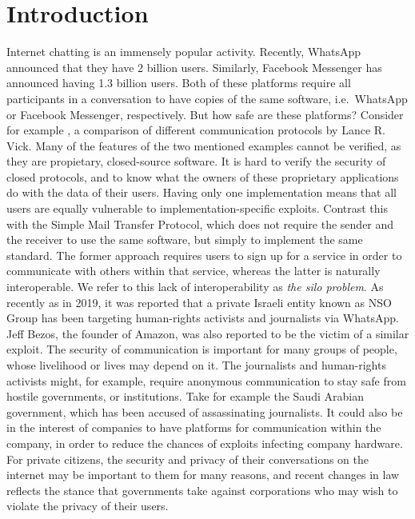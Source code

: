 \section{Introduction}
Internet chatting is an immensely popular activity.
Recently, WhatsApp announced that they have 2 billion users\cite{whatsapp_2b_users_archive_org}.
Similarly, Facebook Messenger has announced having 1.3 billion users\cite{messenger_1pt3b_users}.
Both of these platforms require all participants in a conversation to have copies of the same software, i.e.~WhatsApp or Facebook Messenger, respectively.
But how safe are these platforms?
Consider for example \cite{twitter_comms_protocol_comparison}, a comparison of different communication protocols by Lance R. Vick.
Many of the features of the two mentioned examples cannot be verified, as they are propietary, closed-source software.
It is hard to verify the security of closed protocols, and to know what the owners of these proprietary applications do with the data of their users.
Having only one implementation means that all users are equally vulnerable to implementation-specific exploits.
Contrast this with the Simple Mail Transfer Protocol\cite{RFC5321}, which does not require the sender and the receiver to use the same software, but simply to implement the same standard.
The former approach requires users to sign up for a service in order to communicate with others within that service, whereas the latter is naturally interoperable.
We refer to this lack of interoperability as \textit{the silo problem}.
As recently as in 2019, it was reported that a private Israeli entity known as NSO Group has been targeting human-rights activists and journalists via WhatsApp\cite{nytimes_nso_group}.
Jeff Bezos, the founder of Amazon, was also reported to be the victim of a similar exploit\cite{nytimes_bezos_hack}.
The security of communication is important for many groups of people, whose livelihood or lives may depend on it.
The journalists and human-rights activists might, for example, require anonymous communication to stay safe from hostile governments, or institutions.
Take for example the Saudi Arabian government, which has been accused of assassinating journalists\cite{un_jamal_report}.
It could also be in the interest of companies to have platforms for communication within the company, in order to reduce the chances of exploits infecting company hardware.
For private citizens, the security and privacy of their conversations on the internet may be important to them for many reasons, and recent changes in law reflects the stance that governments take against corporations who may wish to violate the privacy of their users.

